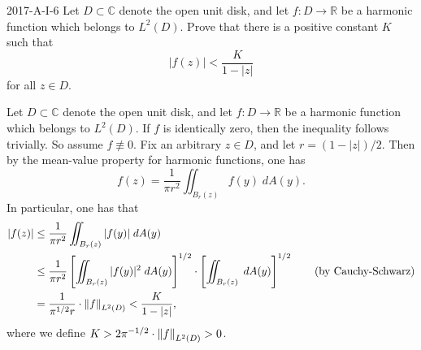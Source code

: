 \documentclass{article}
\begin{document}
	\begin{prb}{2017-A-I-6}
		Let $D \subset \mathbb{C}$ denote the open unit disk, and let $f: D \to \mathbb{R}$ be a harmonic function which belongs to $L^{2}(D)$. Prove that there is a positive constant $K$ such that 
		\begin{equation*}
			|f(z)| < \frac{K}{1 - |z|}
		\end{equation*}
		for all $z \in D$. 
	\end{prb}
	Let $D \subset \mathbb{C}$ denote the open unit disk, and let $f: D \to \mathbb{R}$ be a harmonic function which belongs to $L^{2}(D)$.  If $f$ is identically zero, then the inequality follows trivially. So assume $f \not\equiv 0$. Fix an arbitrary $z \in D$, and let $r = (1 - |z|)/2$. Then by the mean-value property for harmonic functions, one has 
	\begin{equation*}
		f(z) = \frac{1}{\pi r^{2}}\iint_{B_{r}(z)}f(y)\;dA(y). 
	\end{equation*}
	In particular, one has that 
	\begin{align*}
		\begin{split}
			|f(z)| &\leq \frac{1}{\pi r^{2}}\iint_{B_{r}(z)}|f(y)|\;dA(y) \\
			&\leq \frac{1}{\pi r^{2}}\left[\iint_{B_{r}(z)}|f(y)|^{2}\;dA(y)\right]^{1/2}\cdot \left[\iint_{B_{r}(z)}\;dA(y)\right]^{1/2} \qquad (\text{by Cauchy-Schwarz}) \\
			&= \frac{1}{\pi^{1/2}r} \cdot \left\Vert f \right\Vert_{L^{2}(D)} < \frac{K}{1 - |z|},  
		\end{split}
	\end{align*}
	where we define $K > 2\pi^{-1/2} \cdot \left\Vert f \right\Vert_{L^{2}(D)} > 0$. 
	
\end{document}
